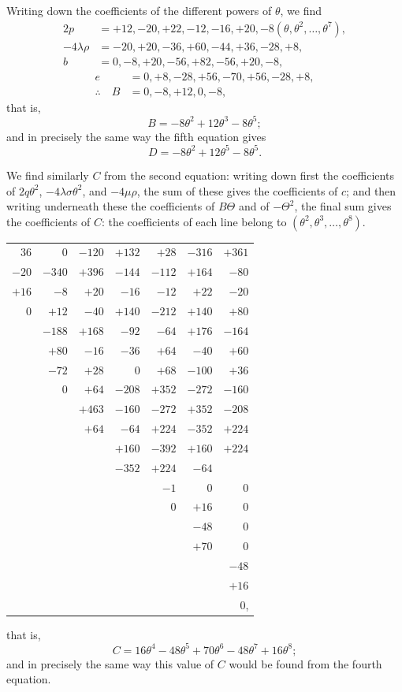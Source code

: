 \documentclass[12pt,a4paper]{article}
\begin{document}
Writing down the coefficients of the different powers of $\theta$, we find
\begin{align*}
2p &= +12, -20, +22, -12, -16, +20, -8 (\theta, \theta^2, \ldots, \theta^7),\\
-4\lambda\rho &= -20, +20, -36, +60, -44, +36, -28, +8,\\
b &= 0, -8, +20, -56, +82, -56, +20, -8,
\end{align*}
\begin{align*}
e &= 0, +8, -28, +56, -70, +56, -28, +8,\\
\therefore\quad B &= 0, -8, +12, 0, -8,
\end{align*}
that is,
\[
B = -8\theta^2 + 12\theta^3 - 8\theta^5;
\]
and in precisely the same way the fifth equation gives
\[
D = -8\theta^2 + 12\theta^5 - 8\theta^5.
\]

We find similarly $C$ from the second equation: writing down first the coefficients of $2q\theta^2$, $-4\lambda\sigma\theta^2$, and $-4\mu\rho$, the sum of these gives the coefficients of $c$; and then writing underneath these the coefficients of $B\Theta$ and of $-\Theta^2$, the final sum gives the coefficients of $C$: the coefficients of each line belong to $(\theta^2, \theta^3, \ldots, \theta^8)$.
\begin{center}
\begin{tabular}{r@{\ }r@{\ }r@{\ }r@{\ }r@{\ }r@{\ }r}
36 & 0 & $-120$ & $+132$ & $+28$ & $-316$ & $+361$ \\
$-20$ & $-340$ & $+396$ & $-144$ & $-112$ & $+164$ & $-80$ \\
$+16$ & $-8$ & $+20$ & $-16$ & $-12$ & $+22$ & $-20$ \\
\midrule
0 & $+12$ & $-40$ & $+140$ & $-212$ & $+140$ & $+80$ \\
& $-188$ & $+168$ & $-92$ & $-64$ & $+176$ & $-164$ \\
& $+80$ & $-16$ & $-36$ & $+64$ & $-40$ & $+60$ \\
\midrule
& $-72$ & $+28$ & 0 & $+68$ & $-100$ & $+36$ \\
& 0 & $+64$ & $-208$ & $+352$ & $-272$ & $-160$ \\
\midrule
& & $+463$ & $-160$ & $-272$ & $+352$ & $-208$ \\
& & $+64$ & $-64$ & $+224$ & $-352$ & $+224$ \\
\midrule
& & & $+160$ & $-392$ & $+160$ & $+224$ \\
& & & $-352$ & $+224$ & $-64$ & \\
\midrule
& & & & $-1$ & 0 & 0 \\
& & & & 0 & $+16$ & 0 \\
\midrule
& & & & & $-48$ & 0 \\
& & & & & $+70$ & 0 \\
\midrule
& & & & & & $-48$ \\
& & & & & & $+16$ \\
\midrule
& & & & & & 0,
\end{tabular}
\end{center}
that is,
\[
C = 16\theta^4 - 48\theta^5 + 70\theta^6 - 48\theta^7 + 16\theta^8;
\]
and in precisely the same way this value of $C$ would be found from the fourth equation.
\end{document}
